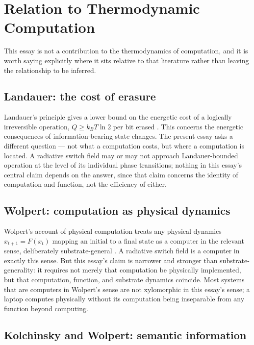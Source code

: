 \documentclass[11pt]{article}
\begin{document}
\section{Relation to Thermodynamic Computation}

This essay is not a contribution to the thermodynamics of computation, and it is worth saying explicitly where it sits relative to that literature rather than leaving the relationship to be inferred.

\subsection{Landauer: the cost of erasure}

Landauer's principle gives a lower bound on the energetic cost of a logically irreversible operation, $Q \ge k_B T \ln 2$ per bit erased \cite{landauer1961}. This concerns the energetic consequences of information-bearing state changes. The present essay asks a different question --- not what a computation costs, but where a computation is located. A radiative switch field may or may not approach Landauer-bounded operation at the level of its individual phase transitions; nothing in this essay's central claim depends on the answer, since that claim concerns the identity of computation and function, not the efficiency of either.

\subsection{Wolpert: computation as physical dynamics}

Wolpert's account of physical computation treats any physical dynamics $x_{t+1} = F(x_t)$ mapping an initial to a final state as a computer in the relevant sense, deliberately substrate-general \cite{wolpert2008}. A radiative switch field is a computer in exactly this sense. But this essay's claim is narrower and stronger than substrate-generality: it requires not merely that computation be physically implemented, but that computation, function, and substrate dynamics coincide. Most systems that are computers in Wolpert's sense are not xylomorphic in this essay's sense; a laptop computes physically without its computation being inseparable from any function beyond computing.

\subsection{Kolchinsky and Wolpert: semantic information}
\end{document}

